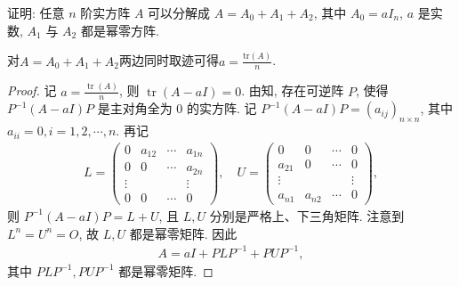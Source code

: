 \documentclass[../../main.tex]{subfiles}%
\begin{document}
\begin{example}
证明: 任意 $n$ 阶实方阵 $A$ 可以分解成 $A=A_0+A_1+A_2$, 其中 $A_0=aI_n$, $a$ 是实数, $A_1$ 与 $A_2$ 都是幂零方阵.
\end{example}
\begin{remark}
对$A=A_0+A_1+A_2$两边同时取迹可得$a=\frac{\mathrm{tr}(A)}{n}$.
\end{remark}
\begin{proof}

记 $a=\frac{\operatorname{tr}(A)}{n}$, 则 $\operatorname{tr}(A-aI)=0$. 由知, 存在可逆阵 $P$, 使得 $P^{-1}(A-aI)P$ 是主对角全为 $0$ 的实方阵.
记 $P^{-1}(A-aI)P=(a_{ij})_{n\times n}$, 其中 $a_{ii}=0,i=1,2,\cdots,n$. 再记
\begin{align*}
L=\begin{pmatrix}
0 & a_{12} & \cdots & a_{1n} \\
0 & 0 & \cdots & a_{2n} \\
\vdots & & & \vdots \\
0 & 0 & \cdots & 0
\end{pmatrix},\quad U=\begin{pmatrix}
0 & 0 & \cdots & 0 \\
a_{21} & 0 & \cdots & 0 \\
\vdots & & & \vdots \\
a_{n1} & a_{n2} & \cdots & 0
\end{pmatrix},
\end{align*}
则 $P^{-1}(A-aI)P=L+U$, 且 $L,U$ 分别是严格上、下三角矩阵. 注意到 $L^n=U^n=O$, 故 $L,U$ 都是幂零矩阵. 因此
\begin{align*}
A=aI+PLP^{-1}+PUP^{-1},
\end{align*}
其中 $PLP^{-1},PUP^{-1}$ 都是幂零矩阵.

\end{proof}
\end{document}
